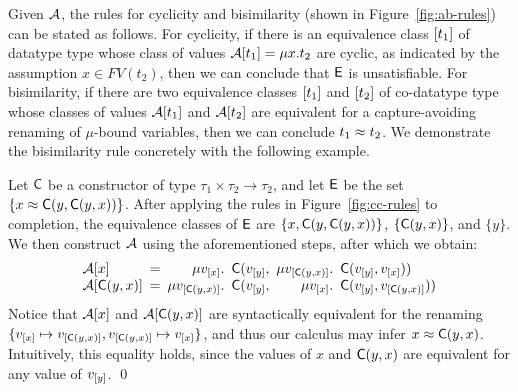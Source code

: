 Given $\mathcal{A}$, the rules for cyclicity and bisimilarity (shown in Figure~\ref{fig:ab-rules}) can be stated as follows.
For cyclicity, if there is an equivalence class $[ t_1 ]$ of datatype type whose class of values $\mathcal{A} [ t_1 ] = \mu x. t_2$ are cyclic,
as indicated by the assumption $x \in FV( t_2 )$,
then we can conclude that $\mathsf{E}$ is unsatisfiable.
For bisimilarity, if there are two equivalence classes $[ t_1 ]$ and $[ t_2 ]$ 
of co-datatype type whose classes of values $\mathcal{A} [ t_1 ]$ and $\mathcal{A} [ t_2 ]$ are equivalent for a capture-avoiding renaming of $\mu$-bound variables,
then we can conclude $t_1 \approx t_2$.
We demonstrate the bisimilarity rule concretely with the following example.

\begin{example}
Let $\textsf{C}$ be a constructor of type $\tau_1 \times \tau_2 \rightarrow \tau_2$,
and let $\mathsf{E}$ be the set $\{ x \approx \textsf{C}(y,\textsf{C}(y,x)) \}$.
After applying the rules in Figure~\ref{fig:cc-rules} to completion, the equivalence classes of $\mathsf{E}$ are
$\{ x, \textsf{C}(y,\textsf{C}(y,x)) \}$, $\{ \textsf{C}(y,x) \}$, and $\{ y \}$.
We then construct $\mathcal{A}$ using the aforementioned steps, after which we obtain:
\[\begin{array}{l@{\hspace{.5em}}l@{\hspace{.5em}}r@{\hspace{.5em}}l@{\hspace{.5em}}r@{\hspace{.5em}}l}
\Val \ec{x} & = & 
\mu v_{\ec{x}}. & \const{C}( v_{\ec{y}}, & \mu v_{\ec{\const{C}(y,x)}}. & \const{C}( v_{\ec{y}}, v_{\ec{x}} ) ) \\
\Val \ec{\const{C}(y,x)} & = & 
\mu v_{\ec{\const{C}(y,x)}}. & \const{C}( v_{\ec{y}}, & \mu v_{\ec{x}}. & \const{C}( v_{\ec{y}}, v_{\ec{\const{C}(y,x)}} ) )
\end{array}\]
Notice that $\mathcal{A} [ x ]$ and $\mathcal{A} [ \textsf{C}(y,x) ]$ are syntactically equivalent for the renaming
$\{ v_{[ x ]} \mapsto v_{[ \textsf{C}(y,x) ]}, v_{[ \textsf{C}(y,x) ]} \mapsto v_{[ x ]} \}$,
and thus our calculus may infer $x \approx \textsf{C}(y,x)$.
Intuitively, this equality holds, since the values of $x$ and $\textsf{C}( y, x )$ 
are equivalent for any value of $v_{[ y ]}$.
\qed
\end{example}


